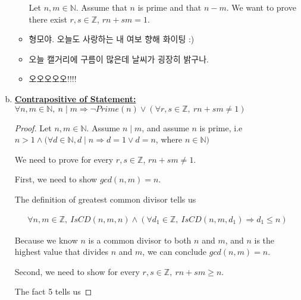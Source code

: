 \documentclass[12pt]{article}
\begin{document}
\begin{enumerate}[a.]
\begin{itemize}
        \begin{mdframed}
            Let $n, m \in \mathbb{N}$. Assume that $n$ is prime and that $n - m$.
            We want to prove there exist $r, s \in \mathbb{Z}$, $rn + sm = 1$.

        \end{mdframed}
        \item 형모야. 오늘도 사랑하는 내 여보 향해 화이팅 :)
        \item 오늘 캘거리에 구름이 많은데 날씨가 굉장히 밝구나.
        \item 오오오오오!!!!
    \end{itemize}

    \item

    \underline{\textbf{Contrapositive of Statement:}} $\forall n,m \in \mathbb{N},\:
    n \mid m \Rightarrow \neg Prime(n) \lor (\forall r,s \in \mathbb{Z},\:rn + sm \neq 1)$

    \begin{proof}
        Let $n,m \in \mathbb{N}$. Assume $n \mid m$, and assume $n$ is prime, i.e
        $n > 1 \land (\forall d \in \mathbb{N}, d \mid n \Rightarrow d = 1 \lor d = n$, where $n \in \mathbb{N})$

        \bigskip

        We need to prove for every $r,s \in \mathbb{Z}$, $rn + sm \neq 1$.

        \bigskip

        First, we need to show $gcd(n,m) = n$.

        \bigskip

        The definition of greatest common divisor tells us

        \begin{align}
            \forall n,m \in \mathbb{Z},\:IsCD(n,m,n) \land (\forall d_1 \in \mathbb{Z},\: IsCD(n,m,d_1) \Rightarrow d_1 \leq n)
        \end{align}

        \bigskip

        Because we know $n$ is a common divisor to both $n$ and $m$, and $n$
        is the highest value that divides $n$ and $m$, we can conclude
        $gcd(n,m) = n$.

        \bigskip

        Second, we need to show for every $r,s \in \mathbb{Z},\:rn + sm \geq n$.

        \bigskip

        The fact 5 tells us


\end{proof}
\end{enumerate}
\end{document}
